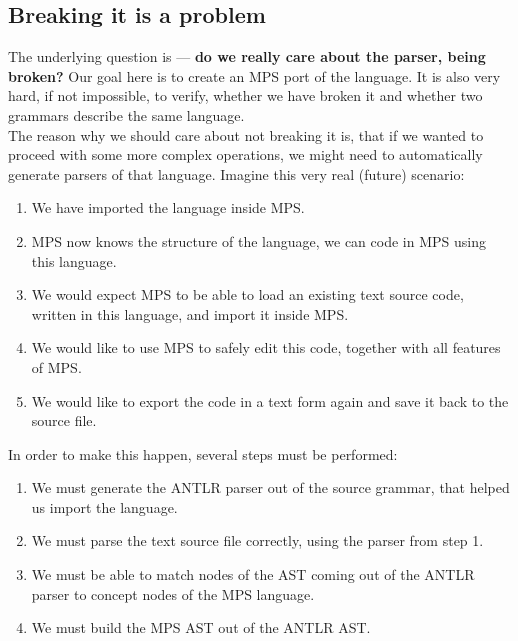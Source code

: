 \subsection{Breaking it is a problem}

The underlying question is --- \textbf{do we really care about the parser, being broken?}
Our goal here is to create an MPS port of the language.
It is also very hard, if not impossible, to verify, whether we have broken it and whether two grammars describe the same language.
\\

The reason why we should care about not breaking it is, that if we wanted to proceed with some more complex operations, we might need to automatically generate parsers of that language.
Imagine this very real (future) scenario:

\begin{enumerate}
	\item We have imported the language inside MPS.

	\item MPS now knows the structure of the language, we can code in MPS using this language.

	\item We would expect MPS to be able to load an existing text source code, written in this language, and import it inside MPS.

	\item We would like to use MPS to safely edit this code, together with all features of MPS.

	\item We would like to export the code in a text form again and save it back to the source file.
\end{enumerate}

\noindent
In order to make this happen, several steps must be performed:

\begin{enumerate}
	\item We must generate the ANTLR parser out of the source grammar, that helped us import the language.

	\item We must parse the text source file correctly, using the parser from step 1.

	\item We must be able to match nodes of the AST coming out of the ANTLR parser to concept nodes of the MPS language.

	\item We must build the MPS AST out of the ANTLR AST.
\end{enumerate}

